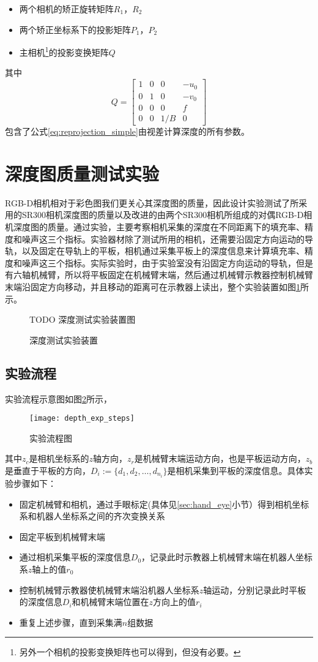 \begin{itemize}
\item 两个相机的矫正旋转矩阵$R_1$，$R_2$
\item 两个矫正坐标系下的投影矩阵$P_1$，$P_2$
\item 主相机\footnote{另外一个相机的投影变换矩阵也可以得到，但没有必要。}的投影变换矩阵$Q$
\end{itemize}
其中
\begin{equation}
  Q = \left[
    \begin{array}{cccc}
      1&0&0&-u_0 \\
       0&1&0&-v_0 \\
       0&0&0&f \\
       0&0&1/B&0
    \end{array}
    \right]
\end{equation}
包含了公式\ref{eq:reprojection_simple}由视差计算深度的所有参数。

\section{深度图质量测试实验}
RGB-D相机相对于彩色图我们更关心其深度图的质量，因此设计实验测试了所采用的SR300相机深度图的质量以及改进的由两个SR300相机所组成的对偶RGB-D相机深度图的质量。通过实验，主要考察相机采集的深度在不同距离下的填充率、精度和噪声这三个指标。实验器材除了测试所用的相机，还需要沿固定方向运动的导轨，以及固定在导轨上的平板，相机通过采集平板上的深度信息来计算填充率、精度和噪声这三个指标。实际实验时，由于实验室没有沿固定方向运动的导轨，但是有六轴机械臂，所以将平板固定在机械臂末端，然后通过机械臂示教器控制机械臂末端沿固定方向移动，并且移动的距离可在示教器上读出，整个实验装置如图\ref{fig:depth_exp_env}所示。
\begin{figure}
  \centering
  TODO 深度测试实验装置图
  \caption{深度测试实验装置}
  \label{fig:depth_exp_env}
\end{figure}

\subsection{实验流程}
实验流程示意图如图\ref{fig:depth_exp_steps}所示，
\begin{figure}
  \centering
  \texttt{[image: depth\_exp\_steps]}
  \caption{实验流程图}
  \label{fig:depth_exp_steps}
\end{figure}
其中$z_c$是相机坐标系的$z$轴方向，$z_r$是机械臂末端运动方向，也是平板运动方向，$z_b$是垂直于平板的方向，$D_i:=\{d_1,d_2,…,d_{n_i}\}$是相机采集到平板的深度信息。具体实验步骤如下：
\begin{itemize}
\item 固定机械臂和相机，通过手眼标定(具体见\ref{sec:hand_eye}小节）得到相机坐标系和机器人坐标系之间的齐次变换关系
\item 固定平板到机械臂末端
\item 通过相机采集平板的深度信息$D_0$，记录此时示教器上机械臂末端在机器人坐标系$z$轴上的值$r_0$
\item 控制机械臂示教器使机械臂末端沿机器人坐标系$z$轴运动，分别记录此时平板的深度信息$D_i$和机械臂末端位置在$z$方向上的值$r_i$
\item 重复上述步骤，直到采集满$n$组数据
\end{itemize}

